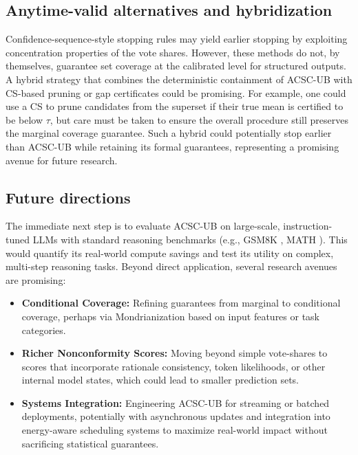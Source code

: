 \documentclass[11pt]{article}
\begin{document}
\subsection{Anytime-valid alternatives and hybridization}
Confidence-sequence-style stopping rules may yield earlier stopping by exploiting concentration properties of the vote shares. However, these methods do not, by themselves, guarantee set coverage at the calibrated level for structured outputs. A hybrid strategy that combines the deterministic containment of ACSC-UB with CS-based pruning or gap certificates could be promising. For example, one could use a CS to prune candidates from the superset if their true mean is certified to be below $\tau$, but care must be taken to ensure the overall procedure still preserves the marginal coverage guarantee. Such a hybrid could potentially stop earlier than ACSC-UB while retaining its formal guarantees, representing a promising avenue for future research.

\subsection{Future directions}
The immediate next step is to evaluate ACSC-UB on large-scale, instruction-tuned LLMs with standard reasoning benchmarks (e.g., GSM8K \cite{cobbe2021gsm8k}, MATH \cite{hendrycks2021math}). This would quantify its real-world compute savings and test its utility on complex, multi-step reasoning tasks. Beyond direct application, several research avenues are promising:
\begin{itemize}
    \item \textbf{Conditional Coverage:} Refining guarantees from marginal to conditional coverage, perhaps via Mondrianization \cite{vovk2003mondrian} based on input features or task categories.
    \item \textbf{Richer Nonconformity Scores:} Moving beyond simple vote-shares to scores that incorporate rationale consistency, token likelihoods, or other internal model states, which could lead to smaller prediction sets.
    \item \textbf{Systems Integration:} Engineering ACSC-UB for streaming or batched deployments, potentially with asynchronous updates and integration into energy-aware scheduling systems to maximize real-world impact without sacrificing statistical guarantees.
\end{itemize}
\end{document}
